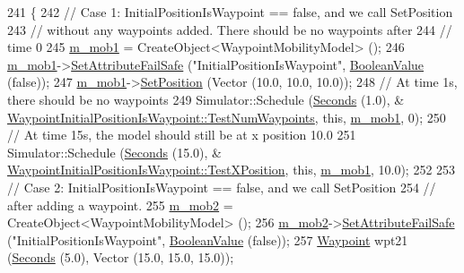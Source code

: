 \begin{DoxyCode}
241 \{
242   \textcolor{comment}{// Case 1:  InitialPositionIsWaypoint == false, and we call SetPosition}
243   \textcolor{comment}{// without any waypoints added.  There should be no waypoints after}
244   \textcolor{comment}{// time 0}
245   \hyperlink{classWaypointInitialPositionIsWaypoint_a9b93ba0b150329a715f03d1e9d17c38f}{m\_mob1} = CreateObject<WaypointMobilityModel> ();
246   \hyperlink{classWaypointInitialPositionIsWaypoint_a9b93ba0b150329a715f03d1e9d17c38f}{m\_mob1}->\hyperlink{classns3_1_1ObjectBase_aa7d333004e970f925a4ed5df275541b5}{SetAttributeFailSafe} (\textcolor{stringliteral}{"InitialPositionIsWaypoint"}, 
      \hyperlink{classns3_1_1BooleanValue}{BooleanValue} (\textcolor{keyword}{false}));
247   \hyperlink{classWaypointInitialPositionIsWaypoint_a9b93ba0b150329a715f03d1e9d17c38f}{m\_mob1}->\hyperlink{classns3_1_1MobilityModel_ac584b3d5a309709d2f13ed6ada1e7640}{SetPosition} (Vector (10.0, 10.0, 10.0));
248   \textcolor{comment}{// At time 1s, there should be no waypoints}
249   Simulator::Schedule (\hyperlink{group__timecivil_ga33c34b816f8ff6628e33d5c8e9713b9e}{Seconds} (1.0), &
      \hyperlink{classWaypointInitialPositionIsWaypoint_ac5c7ce5037e8704d07e7ed5cd1b8646f}{WaypointInitialPositionIsWaypoint::TestNumWaypoints}, \textcolor{keyword}{
      this}, \hyperlink{classWaypointInitialPositionIsWaypoint_a9b93ba0b150329a715f03d1e9d17c38f}{m\_mob1}, 0);
250   \textcolor{comment}{// At time 15s, the model should still be at x position 10.0}
251   Simulator::Schedule (\hyperlink{group__timecivil_ga33c34b816f8ff6628e33d5c8e9713b9e}{Seconds} (15.0), &
      \hyperlink{classWaypointInitialPositionIsWaypoint_aca01ac096251d1abe559ea98cad123e6}{WaypointInitialPositionIsWaypoint::TestXPosition}, \textcolor{keyword}{this}, 
      \hyperlink{classWaypointInitialPositionIsWaypoint_a9b93ba0b150329a715f03d1e9d17c38f}{m\_mob1}, 10.0);
252 
253   \textcolor{comment}{// Case 2:  InitialPositionIsWaypoint == false, and we call SetPosition}
254   \textcolor{comment}{// after adding a waypoint.}
255   \hyperlink{classWaypointInitialPositionIsWaypoint_a7900aaed6cf7a4022808b6905d6d71c1}{m\_mob2} = CreateObject<WaypointMobilityModel> ();
256   \hyperlink{classWaypointInitialPositionIsWaypoint_a7900aaed6cf7a4022808b6905d6d71c1}{m\_mob2}->\hyperlink{classns3_1_1ObjectBase_aa7d333004e970f925a4ed5df275541b5}{SetAttributeFailSafe} (\textcolor{stringliteral}{"InitialPositionIsWaypoint"}, 
      \hyperlink{classns3_1_1BooleanValue}{BooleanValue} (\textcolor{keyword}{false}));
257   \hyperlink{classns3_1_1Waypoint}{Waypoint} wpt21 (\hyperlink{group__timecivil_ga33c34b816f8ff6628e33d5c8e9713b9e}{Seconds} (5.0), Vector (15.0, 15.0, 15.0));

\end{DoxyCode}
